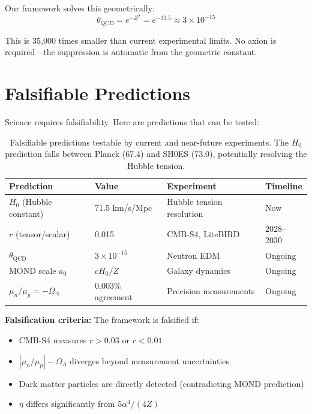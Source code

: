 \documentclass[11pt,a4paper]{article}
\theoremstyle{plain}
\theoremstyle{definition}
\theoremstyle{remark}
\newcommand{\OmegaL}{\Omega_\Lambda}
\begin{document}
Our framework solves this geometrically:
\[
\theta_{\text{QCD}} = e^{-Z^2} = e^{-33.5} \approx 3 \times 10^{-15}
\]

This is 35,000 times smaller than current experimental limits. No axion is required---the suppression is automatic from the geometric constant.

\section{Falsifiable Predictions}

Science requires falsifiability. Here are predictions that can be tested:

\begin{table}[h!]
\centering
\begin{tabular}{llll}
\toprule
\textbf{Prediction} & \textbf{Value} & \textbf{Experiment} & \textbf{Timeline} \\
\midrule
$H_0$ (Hubble constant) & 71.5 km/s/Mpc & Hubble tension resolution & Now \\
$r$ (tensor/scalar) & 0.015 & CMB-S4, LiteBIRD & 2028--2030 \\
$\theta_{\text{QCD}}$ & $3 \times 10^{-15}$ & Neutron EDM & Ongoing \\
MOND scale $a_0$ & $cH_0/Z$ & Galaxy dynamics & Ongoing \\
$\mu_n/\mu_p = -\OmegaL$ & 0.003\% agreement & Precision measurements & Ongoing \\
\bottomrule
\end{tabular}
\caption{Falsifiable predictions testable by current and near-future experiments. The $H_0$ prediction falls between Planck (67.4) and SH0ES (73.0), potentially resolving the Hubble tension.}
\end{table}

\textbf{Falsification criteria:} The framework is falsified if:
\begin{itemize}
  \item CMB-S4 measures $r > 0.03$ or $r < 0.01$
  \item $|\mu_n/\mu_p| - \OmegaL$ diverges beyond measurement uncertainties
  \item Dark matter particles are directly detected (contradicting MOND prediction)
  \item $\eta$ differs significantly from $5\alpha^4/(4Z)$
\end{itemize}
\end{document}

